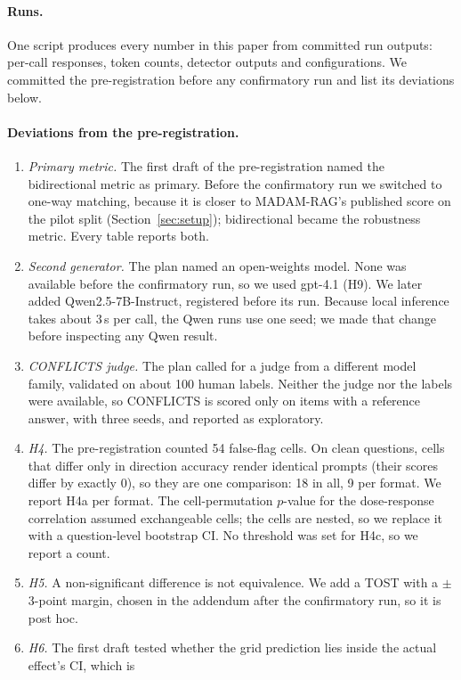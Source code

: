 \paragraph{Runs.} One script produces every number in this paper from committed run outputs: per-call responses,
token counts, detector outputs and configurations. We committed the pre-registration before any confirmatory run and
list its deviations below.

\paragraph{Deviations from the pre-registration.}
\begin{enumerate}[leftmargin=*,itemsep=1pt,topsep=2pt]
\item \emph{Primary metric.} The first draft of the pre-registration named the bidirectional metric as primary. Before
the confirmatory run we switched to one-way matching, because it is closer to MADAM-RAG's published score on the pilot
split (Section~\ref{sec:setup}); bidirectional became the robustness metric. Every table reports both.
\item \emph{Second generator.} The plan named an open-weights model. None was available before the confirmatory run, so
we used gpt-4.1 (H9). We later added Qwen2.5-7B-Instruct, registered before its run. Because local inference
takes about 3\,s per call, the Qwen runs use one seed; we made that change before inspecting any Qwen result.
\item \emph{CONFLICTS judge.} The plan called for a judge from a different model family, validated on about 100 human
labels. Neither the judge nor the labels were available, so CONFLICTS is scored only on items with a reference answer,
with three seeds, and reported as exploratory.
\item \emph{H4.} The pre-registration counted 54 false-flag cells. On clean questions, cells that differ only in
direction accuracy render identical prompts (their scores differ by exactly 0), so they are one comparison: 18 in
all, 9 per format. We report H4a per format. The cell-permutation $p$-value for the dose-response correlation assumed
exchangeable cells; the cells are nested, so we replace it with a question-level bootstrap CI. No threshold was set
for H4c, so we report a count.
\item \emph{H5.} A non-significant difference is not equivalence. We add a TOST with a $\pm$3-point margin, chosen in
the addendum after the confirmatory run, so it is post hoc.
\item \emph{H6.} The first draft tested whether the grid prediction lies inside the actual effect's CI, which is

\end{enumerate}

